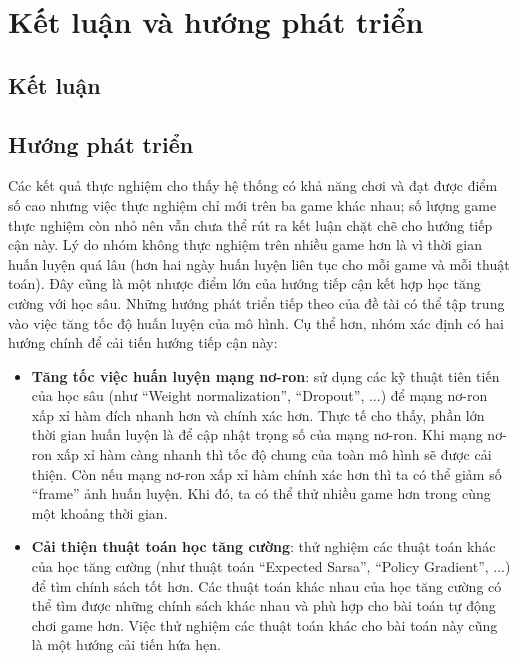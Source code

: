 \chapter{Kết luận và hướng phát triển}
\section{Kết luận}
\section{Hướng phát triển}
	Các kết quả thực nghiệm cho thấy hệ thống có khả năng chơi và đạt được điểm số cao nhưng việc thực nghiệm chỉ mới trên ba game khác nhau; số lượng game thực nghiệm còn nhỏ nên vẫn chưa thể rút ra kết luận chặt chẽ cho hướng tiếp cận này.
	Lý do nhóm không thực nghiệm trên nhiều game hơn là vì thời gian huấn luyện quá lâu (hơn hai ngày huấn luyện liên tục cho mỗi game và mỗi thuật toán).
	Đây cũng là một nhược điểm lớn của hướng tiếp cận kết hợp học tăng cường với học sâu.
	Những hướng phát triển tiếp theo của đề tài có thể tập trung vào việc tăng tốc độ huấn luyện của mô hình.
	Cụ thể hơn, nhóm xác định có hai hướng chính để cải tiến hướng tiếp cận này:
	\begin{itemize}
		\item \textbf{Tăng tốc việc huấn luyện mạng nơ-ron}: sử dụng các kỹ thuật tiên tiến của học sâu (như ``Weight normalization'', ``Dropout'', ...) để mạng nơ-ron xấp xỉ hàm đích nhanh hơn và chính xác hơn.
		Thực tế cho thấy, phần lớn thời gian huấn luyện là để cập nhật trọng số của mạng nơ-ron. 
		Khi mạng nơ-ron xấp xỉ hàm càng nhanh thì tốc độ chung của toàn mô hình sẽ được cải thiện.
		Còn nếu mạng nơ-ron xấp xỉ hàm chính xác hơn thì ta có thể giảm số ``frame'' ảnh huấn luyện.
		Khi đó, ta có thể thử nhiều game hơn trong cùng một khoảng thời gian.
		\item \textbf{Cải thiện thuật toán học tăng cường}: thử nghiệm các thuật toán khác của học tăng cường (như thuật toán ``Expected Sarsa'', ``Policy Gradient'', ...) để tìm chính sách tốt hơn.
		Các thuật toán khác nhau của học tăng cường có thể tìm được những chính sách khác nhau và phù hợp cho bài toán tự động chơi game hơn.
		Việc thử nghiệm các thuật toán khác cho bài toán này cũng là một hướng cải tiến hứa hẹn.
	\end{itemize}
	